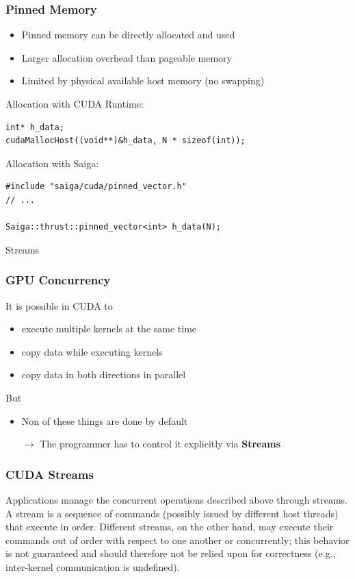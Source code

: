 \documentclass[aspectratio=169,handout]{beamer}
\begin{document}
\begin{frame}[fragile]
\frametitle{Pinned Memory}
\begin{itemize}
	\item Pinned memory can be directly allocated and used
	\item Larger allocation overhead than pageable memory
	\item Limited by physical available host memory (no swapping)
\end{itemize}
Allocation with CUDA Runtime:
\begin{lstlisting}
int* h_data;
cudaMallocHost((void**)&h_data, N * sizeof(int));
\end{lstlisting}
Allocation with Saiga:
\begin{lstlisting}
#include "saiga/cuda/pinned_vector.h"
// ...

Saiga::thrust::pinned_vector<int> h_data(N);
\end{lstlisting}
\end{frame}



\frame
{
\begin{center}
\Large Streams
\end{center}
}



\frame
{
	\frametitle{GPU Concurrency}
	It is possible in CUDA to
	\begin{itemize}
		\item execute multiple kernels at the same time
		\item copy data while executing kernels
		\item copy data in both directions in parallel
	\end{itemize}
	But
	\begin{itemize}
		\item Non of these things are done by default
		\item[$\rightarrow$] The programmer has to control it explicitly via \textbf{Streams}
	\end{itemize}
}



\begin{frame}[fragile]
\frametitle{CUDA Streams}
	\begin{mdframed}[frametitle={CUDA Programming Guide}]
Applications manage the concurrent operations described above through streams. A stream is a sequence of commands (possibly issued by different host threads) that execute in order. Different streams, on the other hand, may execute their commands out of order with respect to one another or concurrently; this behavior is not guaranteed and should therefore not be relied upon for correctness (e.g., inter-kernel communication is undefined). 
\end{mdframed}
\end{frame}
\end{document}
